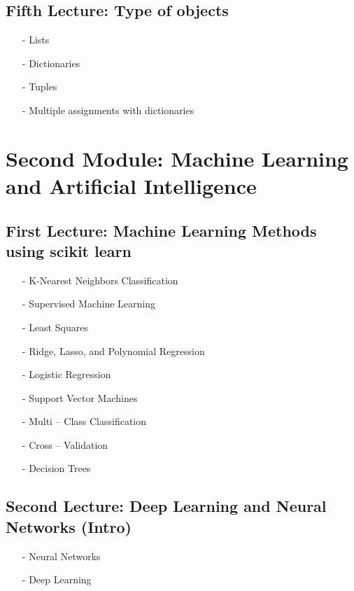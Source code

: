 \documentclass[12pt]{article}
\begin{document}
\subsection*{Fifth Lecture: Type of objects}
\begin{itemize}
\item[-]	Lists
\item[-]	Dictionaries
\item[-]	Tuples
\item[-]	Multiple assignments with dictionaries

\end{itemize}

\section*{Second Module: Machine Learning and Artificial Intelligence}

\subsection*{First Lecture: Machine Learning Methods using scikit learn}
\begin{itemize}
\item[-]	K-Nearest Neighbors Classification
\item[-]	Supervised Machine Learning
\item[-]	Least Squares
\item[-]	Ridge, Lasso, and Polynomial Regression
\item[-]	Logistic Regression
\item[-]	Support Vector Machines
\item[-]	Multi – Class Classification
\item[-]	Cross – Validation
\item[-]	Decision Trees
\end{itemize}

\subsection*{Second Lecture: Deep Learning and Neural Networks (Intro)}
\begin{itemize}
\item[-]	Neural Networks
\item[-]	Deep Learning
\end{itemize}

\newpage

\end{document}
